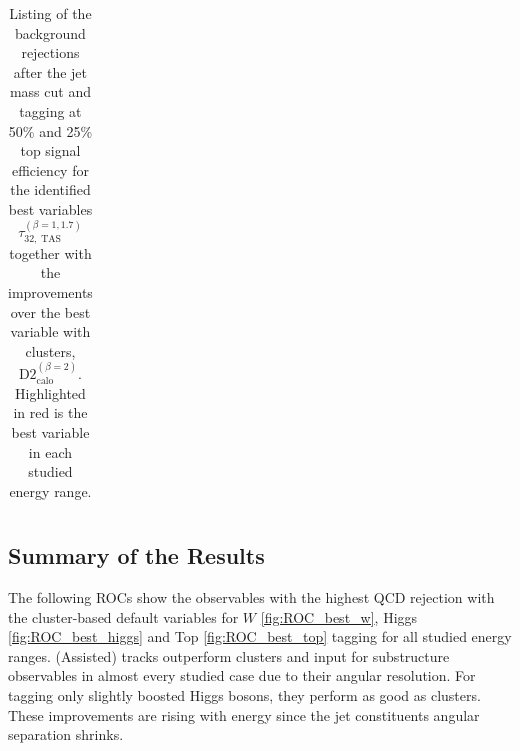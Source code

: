 \begin{table}
\begin{tabular}{llll}
\end{tabular}
\caption{Listing of the background rejections after the jet mass cut and tagging at 50\% and 25\% top signal efficiency for the identified best variables $\tau_{32,\;\text{TAS}}^{(\beta=1,1.7)}$ together with the improvements over the best variable with clusters, $\text{D2}_{\text{calo}}^{(\beta=2)}$. Highlighted in red is the best variable in each studied energy range.}\label{table:top_improvement}
\end{table}


\subsection{Summary of the Results}\label{subsec:best_ROC}
The following ROCs show the observables with the highest QCD rejection with the cluster-based default variables for $W$ \ref{fig:ROC_best_w}, Higgs \ref{fig:ROC_best_higgs} and Top \ref{fig:ROC_best_top} tagging for all studied energy ranges. (Assisted) tracks outperform clusters and input for substructure observables in almost every studied case due to their angular resolution. For tagging only slightly boosted Higgs bosons, they perform as good as clusters. These improvements are rising with energy since the jet constituents angular separation shrinks.
